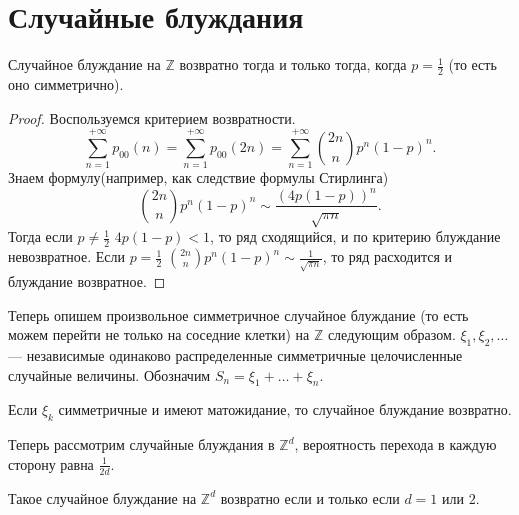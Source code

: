 \section{Случайные блуждания}

 \begin{theorem} \label{th:Zvoz}
     Случайное блуждание на $\mathbb{Z}$ возвратно тогда и только тогда, когда $p = \frac{1}{2}$ (то есть оно симметрично).
 \end{theorem}

 \begin{proof}
 Воспользуемся критерием возвратности.
     $$\sum\limits_{n=1} ^ {+\infty} p_{00}(n) = \sum\limits_{n=1} ^ {+\infty} p_{00}(2n) = \sum\limits_{n=1} ^ {+\infty} \binom{2n}{n}p^n (1 - p)^n.$$
    Знаем формулу(например, как следствие формулы Стирлинга)
     $$\binom{2n}{n}p^n(1-p)^n \sim \frac{(4p(1-p))^n}{\sqrt{\pi n}}.$$
    Тогда
     если $ p \neq\frac{1}{2}$ $4p(1-p) < 1$, то ряд сходящийся, и по критерию блуждание невозвратное.
Если $ p =\frac{1}{2}$ $\binom{2n}{n}p^n(1-p)^n \sim \frac{1}{\sqrt{\pi n}}$, то ряд расходится и блуждание возвратное.
 \end{proof}

 Теперь опишем произвольное симметричное случайное блуждание (то есть можем перейти не только на соседние клетки) на $\mathbb{Z}$ следующим образом.
 $\xi_1, \xi_2, \ldots$ --- независимые одинаково распределенные симметричные целочисленные случайные величины. Обозначим
 $S_n = \xi_1 + \ldots + \xi_n$.

 \begin{theorem}
     Если $\xi_k$ симметричные и имеют матожидание, то случайное блуждание возвратно.
 \end{theorem}

 

 Теперь рассмотрим случайные блуждания в $\mathbb{Z}^d$, вероятность перехода  в каждую сторону равна $\frac{1}{2d}$.

 \begin{theorem}
     Такое случайное блуждание на $\mathbb{Z}^d$ возвратно если и только если $d = 1$ или $2$.
 \end{theorem}

